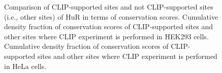 \clearpage
\begin{figure}[H]
	\centering
\quad
\caption[Conservation scores of HuR protein]{Comparison of CLIP-supported sites and not CLIP-supported sites (i.e., other sites) of HuR in terms of conservation scores.  Cumulative density fraction of conservation scores of CLIP-supported sites and other sites where CLIP experiment is performed in HEK293 cells.  Cumulative density fraction of conservation scores of CLIP-supported sites and other sites where CLIP experiment is performed in HeLa cells.}
\label{HuR_conservation}
\end{figure}

\clearpage

